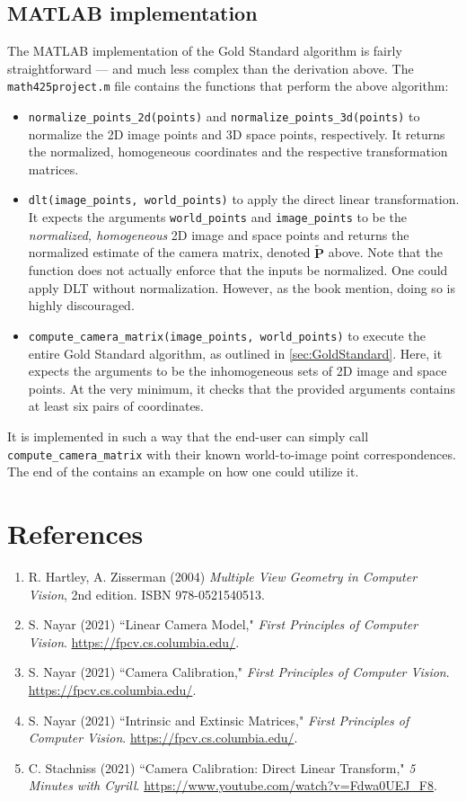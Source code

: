 \documentclass[12pt]{article}
\newcommand{\code}[1]{\texttt{#1}}
\begin{document}
\subsection{MATLAB implementation}

The MATLAB implementation of the Gold Standard algorithm is fairly straightforward --- and much less complex than the derivation above. The  \code{math425project.m} file contains the functions that perform the above algorithm:

\begin{itemize}
    \item \verb|normalize_points_2d(points)| and \verb|normalize_points_3d(points)| to normalize the 2D image points and 3D space points, respectively. It returns the normalized, homogeneous coordinates and the respective transformation matrices.
    \item \verb|dlt(image_points, world_points)| to apply the direct linear transformation. It expects the arguments \verb|world_points| and \verb|image_points| to be the \textit{normalized, homogeneous} 2D image and space points and returns the normalized estimate of the camera matrix, denoted $\tilde{\mathbf{P}}$ above.
    Note that the function does not actually enforce that the inputs be normalized. One could apply DLT without normalization. However, as the book mention, doing so is highly discouraged.
    \item \verb|compute_camera_matrix(image_points, world_points)| to execute the entire Gold Standard algorithm, as outlined in \autoref{sec:GoldStandard}. Here, it expects the arguments to be the inhomogeneous sets of 2D image and space points. At the very minimum, it checks that the provided arguments contains at least six pairs of coordinates.
\end{itemize}

It is implemented in such a way that the end-user can simply call \verb|compute_camera_matrix| with their known world-to-image point correspondences. The end of the contains an example on how one could utilize it.

\section{References}

\begin{enumerate}
    \item R. Hartley, A. Zisserman (2004) \textit{Multiple View Geometry in Computer Vision}, 2nd edition. ISBN 978-0521540513.
    \item S. Nayar (2021) ``Linear Camera Model," \textit{First Principles of Computer Vision}. \url{https://fpcv.cs.columbia.edu/}.
    \item S. Nayar (2021) ``Camera Calibration," \textit{First Principles of Computer Vision}. \url{https://fpcv.cs.columbia.edu/}.
    \item S. Nayar (2021) ``Intrinsic and Extinsic Matrices," \textit{First Principles of Computer Vision}. \url{https://fpcv.cs.columbia.edu/}.
    \item C. Stachniss (2021) ``Camera Calibration: Direct Linear Transform," \textit{5 Minutes with Cyrill}. \url{https://www.youtube.com/watch?v=Fdwa0UEJ_F8}.
\end{enumerate}
\end{document}

